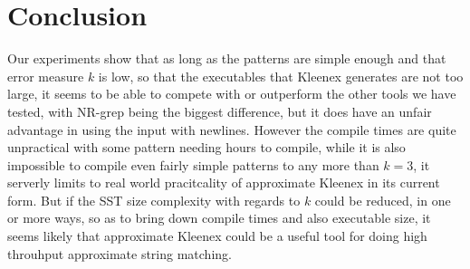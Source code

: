 \section{Conclusion}
Our experiments show that as long as the patterns are simple enough and that
error measure $k$ is low, so that the executables that Kleenex generates are
not too large, it seems to be able to compete with or outperform the other
tools we have tested, with NR-grep being the biggest difference, but it does
have an unfair advantage in using the input with newlines. However the compile
times are quite unpractical with some pattern needing hours to compile, while
it is also impossible to compile even fairly simple patterns to any more than
$k = 3$, it serverly limits to real world pracitcality of approximate Kleenex
in its current form. But if the SST size complexity with regards to $k$ could
be reduced, in one or more ways, so as to bring down compile times and also
executable size, it seems likely that approximate Kleenex could be a useful
tool for doing high throuhput approximate string matching.
